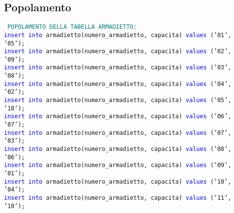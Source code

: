 \documentclass{article}
\begin{document}
\subsection{Popolamento}
    
    \begin{flushleft}
        \texttt{
        \textcolor{teal}{POPOLAMENTO DELLA TABELLA ARMADIETTO:} \\
        \hspace*{0.5em}\textcolor{blue}{insert into} armadietto(numero\_armadietto, capacita) \textcolor{blue}{values} ('01', '05'); \\
        \hspace*{0.5em}\textcolor{blue}{insert into} armadietto(numero\_armadietto, capacita) \textcolor{blue}{values} ('02', '09'); \\
        \hspace*{0.5em}\textcolor{blue}{insert into} armadietto(numero\_armadietto, capacita) \textcolor{blue}{values} ('03', '08'); \\
        \hspace*{0.5em}\textcolor{blue}{insert into} armadietto(numero\_armadietto, capacita) \textcolor{blue}{values} ('04', '02'); \\
        \hspace*{0.5em}\textcolor{blue}{insert into} armadietto(numero\_armadietto, capacita) \textcolor{blue}{values} ('05', '10'); \\
        \hspace*{0.5em}\textcolor{blue}{insert into} armadietto(numero\_armadietto, capacita) \textcolor{blue}{values} ('06', '07'); \\
        \hspace*{0.5em}\textcolor{blue}{insert into} armadietto(numero\_armadietto, capacita) \textcolor{blue}{values} ('07', '03'); \\
        \hspace*{0.5em}\textcolor{blue}{insert into} armadietto(numero\_armadietto, capacita) \textcolor{blue}{values} ('08', '06'); \\
        \hspace*{0.5em}\textcolor{blue}{insert into} armadietto(numero\_armadietto, capacita) \textcolor{blue}{values} ('09', '01'); \\
        \hspace*{0.5em}\textcolor{blue}{insert into} armadietto(numero\_armadietto, capacita) \textcolor{blue}{values} ('10', '04'); \\
        \hspace*{0.5em}\textcolor{blue}{insert into} armadietto(numero\_armadietto, capacita) \textcolor{blue}{values} ('11', '10'); \\
}
\end{flushleft}
\end{document}
